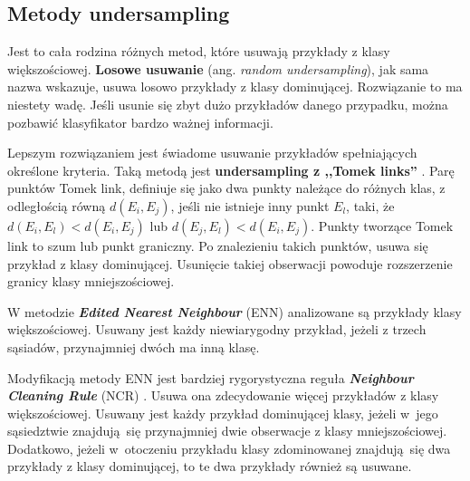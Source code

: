 \subsection{Metody undersampling}
Jest to cała rodzina różnych metod, które usuwają przykłady z klasy większościowej. \textbf{Losowe usuwanie} (ang. \textit{random undersampling}), jak sama nazwa wskazuje, usuwa losowo przykłady z klasy dominującej. Rozwiązanie to ma niestety wadę. Jeśli usunie się zbyt dużo przykładów danego przypadku, można pozbawić klasyfikator bardzo ważnej informacji. \par
Lepszym rozwiązaniem jest świadome usuwanie przykładów spełniających określone kryteria. Taką metodą jest \textbf{undersampling z ,,Tomek links''} \cite{tomelinksc}. Parę punktów Tomek link, definiuje się jako dwa punkty należące do różnych klas, z odległością równą $d(E_i,E_j)$, jeśli nie istnieje inny punkt $E_l$, taki, że $d(E_i,E_l) < d(E_i,E_j)$ lub $d(E_j,E_l) < d(E_i,E_j)$. Punkty tworzące Tomek link to szum lub punkt graniczny. Po znalezieniu takich punktów, usuwa się przykład z klasy dominującej. Usunięcie takiej obserwacji powoduje rozszerzenie granicy klasy mniejszościowej. \par
W metodzie \textbf{\textit{Edited Nearest Neighbour}} (ENN) \cite{enn} analizowane są przykłady klasy większościowej. Usuwany jest każdy niewiarygodny przykład, jeżeli z trzech sąsiadów, przynajmniej dwóch ma inną klasę. \par
Modyfikacją metody ENN jest bardziej rygorystyczna reguła \textbf{\textit{Neighbour Cleaning Rule}} (NCR) \cite{ncr}. Usuwa ona zdecydowanie więcej przykładów z klasy większościowej. Usuwany jest każdy przykład dominującej klasy, jeżeli w~jego sąsiedztwie znajdują się przynajmniej dwie obserwacje z klasy mniejszościowej. Dodatkowo, jeżeli w~otoczeniu przykładu klasy zdominowanej znajdują się dwa przykłady z klasy dominującej, to te dwa przykłady również są usuwane.

